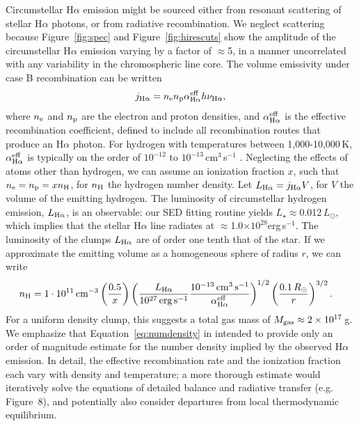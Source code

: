 \documentclass[11pt,twocolumn,tighten,linenumbers]{aastex7}
\begin{document}
Circumstellar H$\alpha$ emission might be sourced either from resonant
scattering of stellar H$\alpha$ photons, or from radiative
recombination.  We neglect scattering because Figure~\ref{fig:spec}
and Figure~\ref{fig:hirescuts} show the amplitude of the
circumstellar H$\alpha$ emission varying by a factor of $\approx$5, in
a manner uncorrelated with any variability in the chromospheric line
core.  The volume emissivity under case B recombination can be written
\begin{equation} j_{\rm H\alpha} = n_{\rm e} n_{\rm p} \alpha^{\rm
eff}_{\rm H\alpha} h \nu_{\rm H\alpha}, \end{equation} where $n_{\rm
e}$ and $n_{\rm p}$ are the electron and proton densities, and
$\alpha^{\rm eff}_{\rm H\alpha}$ is the effective recombination
coefficient, defined to include all recombination routes that produce
an H$\alpha$ photon.  For hydrogen with temperatures between
1,000-10,000\,K, $\alpha^{\rm eff}_{\rm H\alpha}$ is typically on the
order of $10^{-12}$ to $10^{-13}$\,cm$^3$\,s$^{-1}$
\citep{Hummer1987,Draine2011}.  Neglecting the effects of atoms other
than hydrogen, we can assume an ionization fraction $x$, such that
$n_{\rm e} = n_{\rm p} = x n_{\rm H}$, for $n_{\rm H}$ the hydrogen
number density.  Let $L_{\rm H\alpha} = j_{\rm H\alpha} V$, for $V$
the volume of the emitting hydrogen.  The luminosity of circumstellar
hydrogen emission, $L_{\rm H\alpha}$, is an observable: our SED
fitting routine yields $L_\star$$\approx$0.012\,$L_\odot$, which
implies that the stellar H$\alpha$ line radiates at
$\approx$1.0$\times$$10^{28}$erg\,s$^{-1}$.  The luminosity of the
clumps $L_{\rm H\alpha}$ are of order one tenth that of the star.  If
we approximate the emitting volume as a homogeneous sphere of radius
$r$, we can write
\begin{align}
  n_{\rm H} &= 
  1 \cdot 10^{11}\,{\rm cm}^{-3}
  \left(
    \frac{0.5}{x}
  \right)
  \left( 
    \frac{ L_{\rm H\alpha} }{ 10^{27}\,{\rm erg\,s^{-1}} }
    \frac{ 10^{-13}\,{\rm cm^{3}\,s^{-1}} }{ \alpha^{\rm eff}_{\rm H\alpha} }
  \right)^{1/2}
  \left(
    \frac{ 0.1\,R_\odot }{ r }
  \right)^{3/2}.
  \label{eq:numdensity}
\end{align}
For a uniform density clump, this suggests a total gas mass of $M_{\rm
gas}\approx 2\times10^{17}$\,g.  We emphasize that
Equation~\ref{eq:numdensity} in intended to provide only an order of
magnitude estimate for the number density implied by the observed
H$\alpha$ emission.  In detail, the effective recombination rate and
the ionization fraction each vary with density and temperature; a more
thorough estimate would iteratively solve the equations of detailed
balance and radiative transfer (e.g.~\citealt{CollierCameron1989}
Figure~8), and potentially also consider departures from local
thermodynamic equilibrium.
\end{document}
